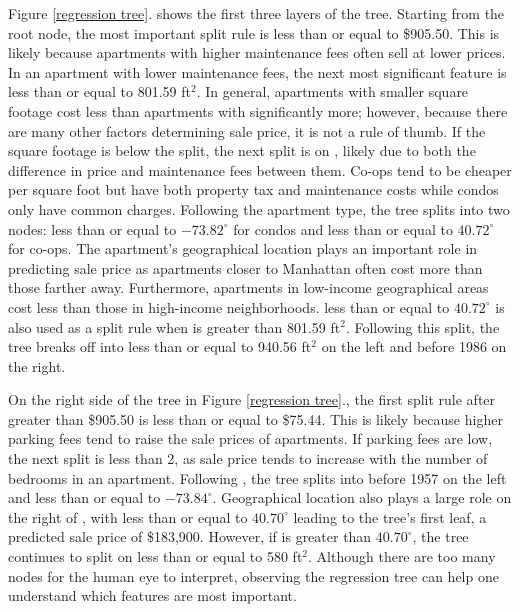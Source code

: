 \documentclass[12pt]{article}
\begin{document}
Figure \ref{regression tree}. shows the first three layers of the tree. Starting from the root node, the most important split rule is  less than or equal to \$905.50. This is likely because apartments with higher maintenance fees often sell at lower prices. In an apartment with lower maintenance fees, the next most significant feature is   less than or equal to 801.59 ft$^2$. In general, apartments with smaller square footage cost less than apartments with significantly more; however, because there are many other factors determining sale price, it is not a rule of thumb. If the square footage is below the split, the next split is on , likely due to both the difference in price and maintenance fees between them. Co-ops tend to be cheaper per square foot but have both property tax and maintenance costs while condos only have common charges. Following the apartment type, the tree splits into two nodes:  less than or equal to $-73.82^{\circ}$ for condos and  less than or equal to $40.72^{\circ}$ for co-ops. The apartment's geographical location plays an important role in predicting sale price as apartments closer to Manhattan often cost more than those farther away. Furthermore, apartments in low-income geographical areas cost less than those in high-income neighborhoods.  less than or equal to $40.72^{\circ}$ is also used as a split rule when  is greater than 801.59 ft$^2$. Following this split, the tree breaks off into  less than or equal to 940.56 ft$^2$ on the left and  before 1986 on the right.

On the right side of the tree in Figure \ref{regression tree}., the first split rule after  greater than \$905.50 is  less than or equal to \$75.44. This is likely because higher parking fees tend to raise the sale prices of apartments. If parking fees are low, the next split is  less than 2, as sale price tends to increase with the number of bedrooms in an apartment. Following , the tree splits into  before 1957 on the left and  less than or equal to $-73.84^{\circ}$. Geographical location also plays a large role on the right of , with  less than or equal to $40.70^{\circ}$ leading to the tree's first leaf, a predicted sale price of \$183,900. However, if  is greater than $40.70^{\circ}$, the tree continues to split on  less than or equal to 580 ft$^2$. Although there are too many nodes for the human eye to interpret, observing the regression tree can help one understand which features are most important.
\end{document}
